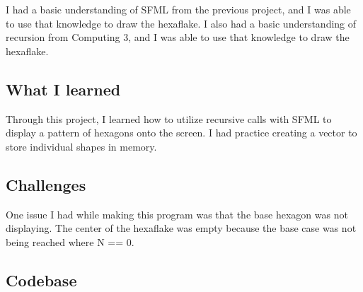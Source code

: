 I had a basic understanding of SFML from the previous project, and I was able to use that knowledge to draw the hexaflake. I also had a basic understanding of recursion from Computing 3, and I was able to use that knowledge to draw the hexaflake.

\subsection{What I learned}\label{sec:ps2:learned}

Through this project, I learned how to utilize recursive calls with SFML to display a pattern of hexagons onto the screen. I had practice creating a vector to store individual shapes in memory.

\subsection{Challenges}\label{sec:ps2:challenges}

One issue I had while making this program was that the base hexagon was not displaying. The center of the hexaflake was empty because the base case was not being reached where N == 0.

\subsection{Codebase}\label{sec:ps2:code}






\newpage

